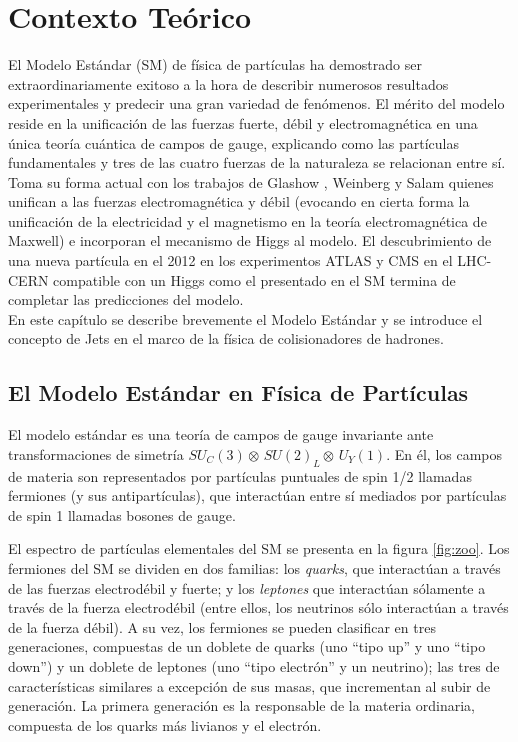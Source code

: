 \chapter{Contexto Teórico}\label{SM}

El Modelo Estándar (SM) de física de partículas ha demostrado ser extraordinariamente exitoso a la hora de describir numerosos resultados experimentales y predecir una gran variedad de fenómenos. El mérito del modelo reside en la unificación de las fuerzas fuerte, débil y electromagnética en una única teoría cuántica de campos de gauge, explicando como las partículas fundamentales y tres de las cuatro fuerzas de la naturaleza se relacionan entre sí.
Toma su forma actual con los trabajos de Glashow \cite{Glashowr}, Weinberg\cite{Weinberg} y Salam \cite{Salam} quienes unifican a las fuerzas electromagnética y débil (evocando en cierta forma la unificación de la electricidad y el magnetismo en la teoría electromagnética de Maxwell) e incorporan el mecanismo de Higgs\cite{MecHiggs1}\cite{MecHiggs2} al modelo. El descubrimiento de una nueva partícula en el 2012 en los experimentos ATLAS\cite{HiggsAtlas} y CMS\cite{HiggsCMS} en el LHC-CERN compatible con un Higgs como el presentado en el SM termina de completar las predicciones del modelo.\\
\indent En este capítulo se describe brevemente el Modelo Estándar y se introduce el concepto de Jets en el marco de la física de colisionadores de hadrones. 

\section{El Modelo Estándar en Física de Partículas}

El modelo estándar es una teoría de campos de gauge invariante ante transformaciones de simetría $SU_C(3)\otimes\,SU(2)_{L}\otimes\,U_Y(1)$. En él, los campos de materia son representados por partículas puntuales de spin 1/2 llamadas fermiones (y sus antipartículas), que interactúan entre sí mediados por partículas de spin 1 llamadas bosones de gauge.  

El espectro de partículas elementales del SM se presenta en la figura  \ref{fig:zoo}. Los fermiones del SM se dividen en dos familias: los \emph{quarks}, que interactúan a través de las fuerzas electrodébil y fuerte; y los \emph{leptones} que interactúan sólamente a través de la fuerza electrodébil (entre ellos, los neutrinos sólo interactúan a través de la fuerza débil). A su vez, los fermiones se pueden clasificar en tres generaciones, compuestas de un doblete de quarks (uno ``tipo up'' y uno ``tipo down'') y un doblete de leptones (uno ``tipo electrón'' y un neutrino); las tres de características similares a excepción de sus masas, que incrementan al subir de generación. La primera generación es la responsable de la materia ordinaria, compuesta de los quarks más livianos y el electrón.

